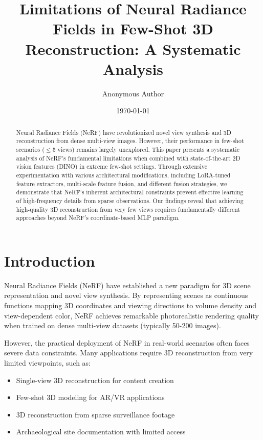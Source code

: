 \documentclass[11pt]{article}
\title{Limitations of Neural Radiance Fields in Few-Shot 3D Reconstruction: A Systematic Analysis}
\author{Anonymous Author}
\date{\today}
\begin{document}
\maketitle

\begin{abstract}
Neural Radiance Fields (NeRF) have revolutionized novel view synthesis and 3D reconstruction from dense multi-view images. However, their performance in few-shot scenarios ($\leq$5 views) remains largely unexplored. This paper presents a systematic analysis of NeRF's fundamental limitations when combined with state-of-the-art 2D vision features (DINO) in extreme few-shot settings. Through extensive experimentation with various architectural modifications, including LoRA-tuned feature extractors, multi-scale feature fusion, and different fusion strategies, we demonstrate that NeRF's inherent architectural constraints prevent effective learning of high-frequency details from sparse observations. Our findings reveal that achieving high-quality 3D reconstruction from very few views requires fundamentally different approaches beyond NeRF's coordinate-based MLP paradigm.
\end{abstract}

\section{Introduction}

Neural Radiance Fields (NeRF) \cite{mildenhall2020nerf} have established a new paradigm for 3D scene representation and novel view synthesis. By representing scenes as continuous functions mapping 3D coordinates and viewing directions to volume density and view-dependent color, NeRF achieves remarkable photorealistic rendering quality when trained on dense multi-view datasets (typically 50-200 images).

However, the practical deployment of NeRF in real-world scenarios often faces severe data constraints. Many applications require 3D reconstruction from very limited viewpoints, such as:
\begin{itemize}
    \item Single-view 3D reconstruction for content creation
    \item Few-shot 3D modeling for AR/VR applications  
    \item 3D reconstruction from sparse surveillance footage
    \item Archaeological site documentation with limited access
\end{itemize}
\end{document}
